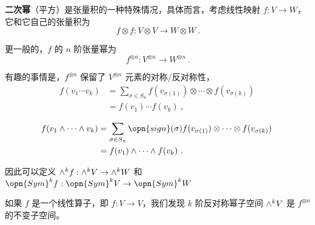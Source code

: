 
\textbf{二次幂}（平方）是张量积的一种特殊情况，具体而言，考虑线性映射 $f: V \to W$，它和它自己的张量积为
\begin{equation}
f \otimes f: V \otimes V \to W \otimes W~.
\end{equation}

更一般的，$f$ 的 $n$ 阶张量幂为
\begin{equation}
f^{\otimes n}: V^{\otimes n} \to W^{\otimes n}~.
\end{equation}

有趣的事情是，$f^{\otimes n}$ 保留了 $V^{\otimes n}$ 元素的对称/反对称性，
\begin{equation}
\begin{aligned}
f(v_1 \cdots v_k) &= \sum_{\sigma \in S_n} f(v_{\sigma(1)}) \otimes \cdots \otimes f(v_{\sigma(k)}) \\
&= f(v_1) \cdots f(v_k)~,
\end{aligned}~
\end{equation}

\begin{equation}
\begin{aligned}
f(v_1 \wedge \cdots \wedge v_k) &= \sum_{\sigma \in S_n} \opn{sign}(\sigma) f(v_{\sigma(1)}) \otimes \cdots \otimes f(v_{\sigma(k)}) \\
&= f(v_1) \wedge \cdots \wedge f(v_k)~.
\end{aligned}~
\end{equation}

因此可以定义 ${\large \wedge}^k f: {\large \wedge}^k V \to {\large \wedge}^k W$ 和 $\opn{Sym}^k f: \opn{Sym}^k V \to \opn{Sym}^k W$

如果 $f$ 是一个线性算子，即 $f: V \to V$，我们发现 $k$ 阶反对称幂子空间 ${\large \wedge}^k V$ 是 $f^{\otimes n}$ 的不变子空间。
